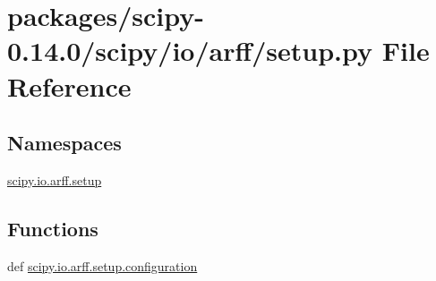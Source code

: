 \hypertarget{packages_2scipy-0_814_80_2scipy_2io_2arff_2setup_8py}{}\section{packages/scipy-\/0.14.0/scipy/io/arff/setup.py File Reference}
\label{packages_2scipy-0_814_80_2scipy_2io_2arff_2setup_8py}
\subsection*{Namespaces}
\begin{DoxyCompactItemize}
\item 
 \hyperlink{namespacescipy_1_1io_1_1arff_1_1setup}{scipy.\+io.\+arff.\+setup}
\end{DoxyCompactItemize}
\subsection*{Functions}
\begin{DoxyCompactItemize}
\item 
def \hyperlink{namespacescipy_1_1io_1_1arff_1_1setup_ae32f958bfe87e0eaefc732066fc931ff}{scipy.\+io.\+arff.\+setup.\+configuration}
\end{DoxyCompactItemize}
